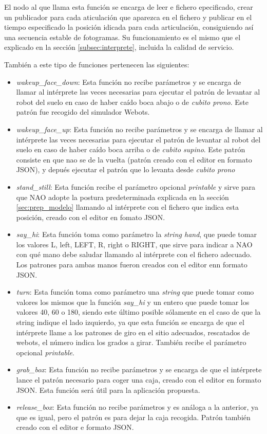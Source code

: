 El nodo al que llama esta función se encarga de leer e fichero epecificado, crear un publicador para cada aticulación que aparezca en el fichero y publicar en el tiempo especificado la posición idicada para  cada articulación, consiguiendo así una secuencia estable de fotogramas. Su funcionamiento es el mismo que el explicado en la sección \ref{subsec:interprete}, incluida la calidad de servicio.

También a este tipo de funciones pertenecen las siguientes:

\begin{itemize}
    \item \textit{wakeup\_face\_down}: Esta función no recibe parámetros y se encarga de llamar al intérprete las veces necesarias para ejecutar el patrón de levantar al robot del suelo en caso de haber caído boca abajo o de \textit{cubito prono}. Este patrón fue recogido del simulador Webots.
    \item \textit{wakeup\_face\_up}: Esta función no recibe parámetros y se encarga de llamar al intérprete las veces necesarias para ejecutar el patrón de levantar al robot del suelo en caso de haber caído boca arriba o de \textit{cubito supino}. Este patrón consiste en que nao se de la vuelta (patrón creado con el editor en formato JSON), y depués ejecutar el patrón que lo levanta desde \textit{cubito prono}
    \item \textit{stand\_still}: Esta función recibe el parámetro opcional \textit{printable} y sirve para que NAO adopte la postura predeterminada explicada en la sección \ref{sec:prep_modelo} llamando al intérprete con el fichero que indica esta posición, creado con el editor en fomato JSON.
    \item \textit{say\_hi}: Esta función toma como parámetro la \textit{string hand}, que puede tomar los valores L, left, LEFT, R, right o RIGHT, que sirve para indicar a NAO con qué mano debe saludar llamando al intérprete con el fichero adecuado. Los patrones para ambas manos fueron creados con el editor enn formato JSON.  
    \item \textit{turn}: Esta función toma como parámetro una \textit{string} que puede tomar como valores los mismos que la función \textit{say\_hi} y un entero que puede tomar los valores 40, 60 o 180, siendo este último posible sólamente en el caso de que la string indique el lado izquierdo, ya que esta función se encarga de que el intérprete llame a los patrones de giro en el sitio adecuados, rescatados de webots, el número indica los grados a girar. También recibe el parámetro opcional \textit{printable}.
    \item \textit{grab\_box}: Esta función no recibe parámetros y se encarga de que el intérprete lance el patrón necesario para coger una caja, creado con el editor en formato JSON. Esta función será útil para la aplicación propuesta.
    \item \textit{release\_box}: Esta función no recibe parámetros y es análoga a la anterior, ya que es igual, pero el patrón es para dejar la caja recogida. Patrón también creado con el editor e formato JSON.
\end{itemize}

